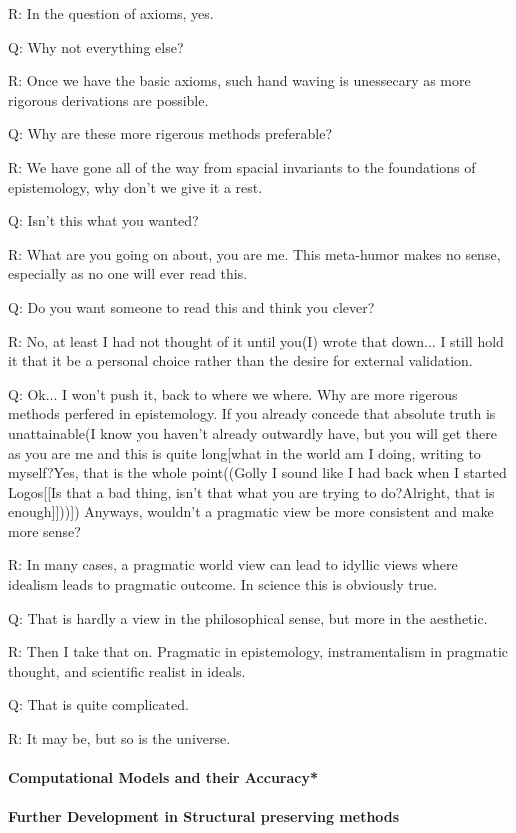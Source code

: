 R: In the question of axioms, yes.

Q: Why not everything else?

R: Once we have the basic axioms, such hand waving is unessecary as more rigorous derivations are possible.

Q: Why are these more rigerous methods preferable?

R: We have gone all of the way from spacial invariants to the foundations of epistemology, why don't we give it a rest.

Q: Isn't this what you wanted?

R: What are you going on about, you are me. This meta-humor makes no sense, especially as no one will ever read this.

Q: Do you want someone to read this and think you clever?

R: No, at least I had not thought of it until you(I) wrote that down... I still hold it that it be a personal choice rather than the desire for external validation.

Q: Ok... I won't push it, back to where we where. Why are more rigerous methods perfered in epistemology. If you already concede that absolute truth is unattainable(I know you haven't already outwardly have, but you will get there as you are me and this is quite long[what in the world am I doing, writing to myself?{Yes, that is the whole point((Golly I sound like I had back when I started Logos[[Is that a bad thing, isn't that what you are trying to do?{{Alright, that is enough}}]]))}]) Anyways, wouldn't a pragmatic view be more consistent and make more sense?

R: In many cases, a pragmatic world view can lead to idyllic views where idealism leads to pragmatic outcome. In science this is obviously true.

Q: That is hardly a view in the philosophical sense, but more in the aesthetic.

R: Then I take that on. Pragmatic in epistemology, instramentalism in pragmatic thought, and scientific realist in ideals.

Q: That is quite complicated.

R: It may be, but so is the universe.

\paragraph{Computational Models and their Accuracy*}

\paragraph{Further Development in Structural preserving methods}

